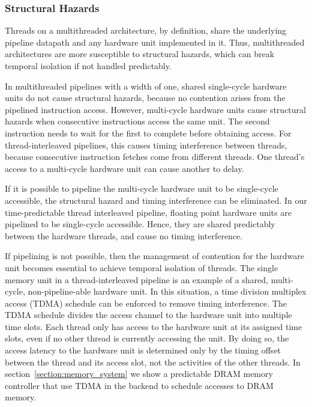 \subsubsection{Structural Hazards}
Threads on a multithreaded architecture, by definition, share the underlying pipeline datapath and any hardware unit implemented in it.
Thus, multithreaded architectures are more susceptible to structural hazards, which can break temporal isolation if not handled predictably.

In multithreaded pipelines with a width of one, shared single-cycle hardware units do not cause structural hazards, because no contention arises from the pipelined instruction access.
However, multi-cycle hardware units cause structural hazards when consecutive instructions access the same unit. 
The second instruction needs to wait for the first to complete before obtaining access.
For thread-interleaved pipelines, this causes timing interference between threads, because consecutive instruction fetches come from different threads.
One thread's access to a multi-cycle hardware unit can cause another to delay.

If it is possible to pipeline the multi-cycle hardware unit to be single-cycle accessible, the structural hazard and timing interference can be eliminated.   
In our time-predictable thread interleaved pipeline, floating point hardware units are pipelined to be single-cycle accessible. 
Hence, they are shared predictably between the hardware threads, and cause no timing interference. 

If pipelining is not possible, then the management of contention for the hardware unit becomes essential to achieve temporal isolation of threads.     
The single memory unit in a thread-interleaved pipeline is an example of a shared, multi-cycle, non-pipeline-able hardware unit.
In this situation, a time division multiplex access (TDMA) schedule can be enforced to remove timing interference.
The TDMA schedule divides the access channel to the hardware unit into multiple time slots.  
Each thread only has access to the hardware unit at its assigned time slots, even if no other thread is currently accessing the unit.
By doing so, the access latency to the hardware unit is determined only by the timing offset between the thread and its access slot, not the activities of the other threads.
In section~\ref{section:memory_system} we show a predictable DRAM memory controller that use TDMA in the backend to schedule accesses to DRAM memory. 

